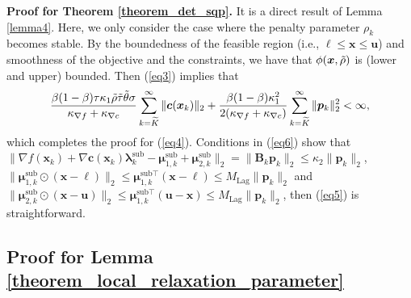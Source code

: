 \documentclass[aos]{imsart}
\numberwithin{equation}{section}
\theoremstyle{plain}
\begin{document}
\begin{appendix}
\textbf{Proof for Theorem \ref{theorem_det_sqp}.}
     It is a direct result of Lemma \ref{lemma4}. Here, we only consider the case where the penalty parameter $\rho_k$ becomes stable. By the boundedness of the feasible region (i.e., $\bm{\ell} \leq \bm{x} \leq \bm{u}$) and smoothness of the objective and the constraints, we have that $\phi(\bm{x},\Tilde{\rho})$ is (lower and upper) bounded. Then (\ref{eq3}) implies that
     \begin{equation*}
          \frac{\beta (1-\beta) \tau\kappa_1 \Tilde{\rho} \Tilde{\tau} \Tilde{\theta} \sigma}{\kappa_{\nabla f}+\kappa_{\nabla c}} \sum_{k=\widetilde{K}}^{\infty} \|\bm{c}(\bm{x}_k)\|_2 + \frac{\beta (1-\beta)\kappa_1^2}{2(\kappa_{\nabla f}+\kappa_{\nabla c})} \sum_{k=\widetilde{K}}^{\infty} \|\bm{p}_k\|_2^2 < \infty,
     \end{equation*}
     which completes the proof for (\ref{eq4}). Conditions in (\ref{eq6}) show that $\| \nabla f(\bm{x}_k) +  \nabla \bm{c}(\bm{x}_k) \bm{\lambda}_k^{\text{sub}} - \bm{\mu}_{1,k}^{\text{sub}} + \bm{\mu}_{2,k}^{\text{sub}} \|_2 = \|\bm{B}_k\bm{p}_k\|_2 \leq \kappa_2 \|\bm{p}_k\|_2$, $\|\bm{\mu}_{1,k}^{\text{sub}} \odot (\bm{x}-\bm{\ell})\|_2 \leq \bm{\mu}_{1,k}^{\text{sub} \top}(\bm{x}-\bm{\ell}) \leq M_{\text{Lag}}\|\bm{p}_k\|_2$ and $\|\bm{\mu}_{2,k}^{\text{sub}} \odot (\bm{x}-\bm{u})\|_2 \leq \bm{\mu}_{1,k}^{\text{sub} \top}(\bm{u}-\bm{x}) \leq M_{\text{Lag}}\|\bm{p}_k\|_2$, then (\ref{eq5}) is straightforward.

\subsection{Proof for Lemma \ref{theorem_local_relaxation_parameter}}


\end{appendix}
\end{document}
